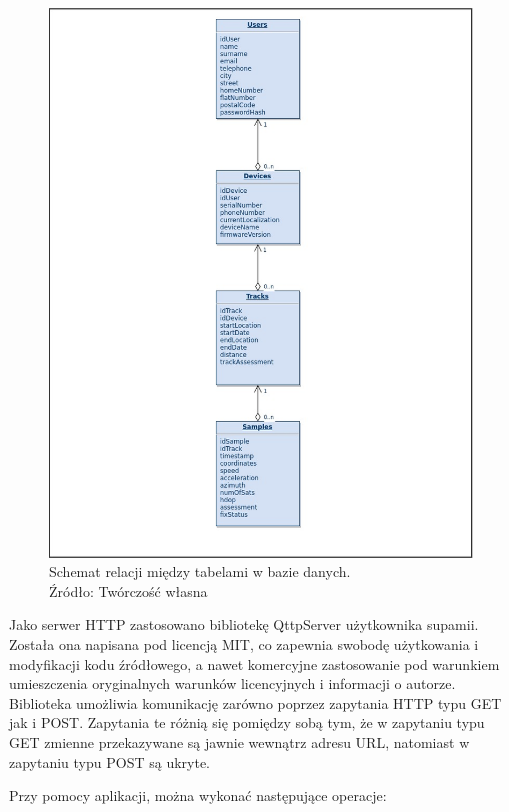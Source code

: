 \begin{figure}[H]
	\centering
	\includegraphics[width=17cm]{img/software/database/Database_relations.jpg}
	\caption{Schemat relacji między tabelami w bazie danych. 
	\\Źródło: Twórczość własna}
	\label{fig:image_soft_db_relations}
\end{figure}

Jako serwer HTTP zastosowano bibliotekę QttpServer użytkownika supamii\cite{qttpserver}. Została ona napisana pod licencją MIT, co zapewnia swobodę użytkowania i modyfikacji kodu źródłowego, a nawet komercyjne zastosowanie pod warunkiem umieszczenia oryginalnych warunków licencyjnych i informacji o autorze. Biblioteka umożliwia komunikację zarówno poprzez zapytania HTTP typu GET jak i POST. Zapytania te różnią się pomiędzy sobą tym, że w zapytaniu typu GET zmienne przekazywane są jawnie wewnątrz adresu URL, natomiast w zapytaniu typu POST są ukryte.

Przy pomocy aplikacji, można wykonać następujące operacje:

